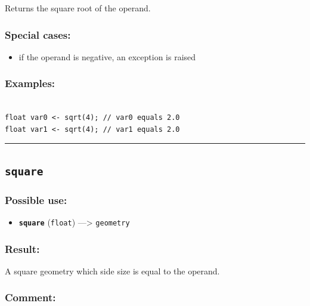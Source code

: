 \documentclass[]{book}
\providecommand{\tightlist}{%
  \setlength{\itemsep}{0pt}\setlength{\parskip}{0pt}}
\theoremstyle{definition}
\theoremstyle{definition}
\theoremstyle{definition}
\theoremstyle{remark}
\begin{document}
Returns the square root of the operand.

\subsubsection{Special cases:}\label{special-cases-129}

\begin{itemize}
\tightlist
\item
  if the operand is negative, an exception is raised
\end{itemize}

\subsubsection{Examples:}\label{examples-347}

\begin{verbatim}
 
float var0 <- sqrt(4); // var0 equals 2.0 
float var1 <- sqrt(4); // var1 equals 2.0
\end{verbatim}

\begin{center}\rule{0.5\linewidth}{\linethickness}\end{center}

\subsection{\texorpdfstring{\texttt{square}}{square}}\label{square}

\subsubsection{Possible use:}\label{possible-use-499}

\begin{itemize}
\tightlist
\item
  \textbf{\texttt{square}} (\texttt{float}) ---\textgreater{}
  \texttt{geometry}
\end{itemize}

\subsubsection{Result:}\label{result-483}

A square geometry which side size is equal to the operand.

\subsubsection{Comment:}\label{comment-92}
\end{document}
